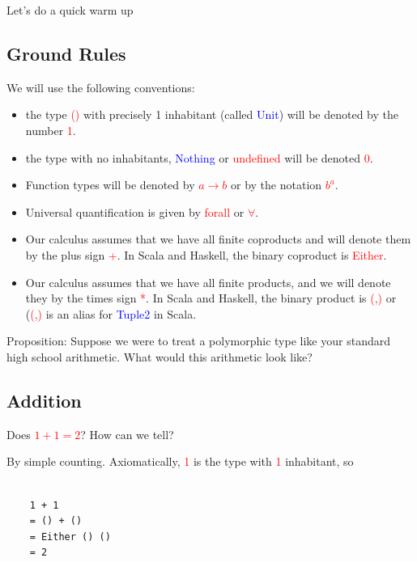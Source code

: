 \documentclass[tikz]{beamer}
\newcommand{\red}[1]{\textcolor{red}{#1}}
\newcommand{\mred}[1]{\textcolor{red}{$#1$}}
\newcommand{\blue}[1]{\textcolor{blue}{#1}}
\theoremstyle{definition}
\begin{document}
\frame
{
	Let's do a quick warm up 
}

\subsection{Ground Rules}

\frame
{ 
	We will use the following conventions: 
	
	\begin{itemize}
		\item the type \red{()} with precisely 1 inhabitant (called \blue{Unit}) will be denoted by the number \red{1}. 
		\item the type with no inhabitants, \blue{Nothing} or \red{undefined} will be denoted \red{0}. 
		\item Function types will be denoted by \red{$a \to b$} or by the notation \red{$b^a$}. 
		\item Universal quantification is given by \red{forall} or \red{$\forall$}.
	\end{itemize}
}

\frame
{
	\begin{itemize}
		\item Our calculus assumes that we have all finite coproducts and will denote them by the plus sign \red{+}. In Scala and Haskell, the binary coproduct is \red{Either}.
		\item Our calculus assumes that we have all finite products, and we will denote they by the times sign \red{*}. In Scala and Haskell, the binary product is \red{(,)} or (\red{(,)} is an alias for \blue{Tuple2} in Scala.
	\end{itemize}
}

\frame
{ 
	Proposition: Suppose we were to treat a polymorphic type like your standard high school arithmetic. What would this arithmetic look like? 
}

\subsection{Addition}

\frame
{ 
	Does \mred{1 + 1 = 2}? How can we tell? 
}

\begin{frame}[fragile]
	By simple counting. Axiomatically, \red{1} is the type with \red{1} inhabitant, so
	\begin{verbatim}
	
	1 + 1  
	= () + ()
	= Either () ()
	= 2
	\end{verbatim}
\end{frame}
\end{document}
